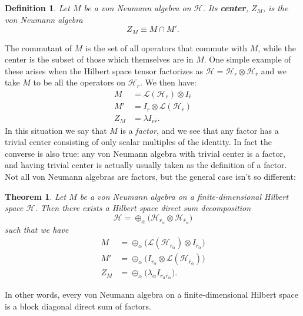 \documentclass[toc]{PoS}
\newcommand{\be}{\begin{equation}}
\newcommand{\ee}{\end{equation}}
\newcommand{\Ll}{\mathcal{L}}
\newcommand{\Hh}{\mathcal{H}}
\newcommand{\ol}{\overline}
\newtheorem{mydef}{Definition}[section]
\newtheorem{thm}{Theorem}[section]
\begin{document}
\begin{mydef}
Let $M$ be a von Neumann algebra on $\Hh$. Its \textbf{center}, $Z_M$, is the von Neumann algebra
\be
Z_M\equiv M\cap M'.
\ee
\end{mydef}
The commutant of $M$ is the set of all operators that commute with $M$, while the center is the subset of those which themselves are in $M$.  One simple example of these arises when the Hilbert space tensor factorizes as $\Hh=\Hh_r\otimes \Hh_{\ol{r}}$ and we take $M$ to be all the operators on $\Hh_r$.  We then have:
\begin{align}\nonumber
M&= \Ll(\Hh_r)\otimes I_{\ol{r}}\\\nonumber
M'&= I_r \otimes \Ll(\Hh_{\ol{r}})\\
Z_M&= \lambda I_{r\ol{r}}.
\end{align}
In this situation we say that $M$ is a \textit{factor}, and we see that any factor has a trivial center consisting of only scalar multiples of the identity.  In fact the converse is also true: any von Neumann algebra with trivial center is a factor, and having trivial center is actually usually taken as the definition of a factor.  Not all von Neumann algebras are factors, but the general case isn't so different:
\begin{thm}\label{vnthm}
Let $M$ be a von Neumann algebra on a finite-dimensional Hilbert space $\Hh$.  Then there exists a Hilbert space direct sum decomposition
\be\label{blockdecomp}
\Hh=\oplus_\alpha \Big(\Hh_{r_\alpha}\otimes \Hh_{\ol{r}_\alpha}\Big)
\ee
such that we have
\begin{align}\nonumber
M&=\oplus_\alpha\Big(\Ll(\Hh_{r_\alpha})\otimes I_{\ol{r}_\alpha}\Big)\\\nonumber
M'&= \oplus_\alpha\Big(I_{r_\alpha} \otimes \Ll(\Hh_{\ol{r}_\alpha})\Big)\\
Z_M&= \oplus_\alpha \Big(\lambda_\alpha I_{r_\alpha\ol{r}_\alpha}\Big).
\end{align}
\end{thm}
In other words, every von Neumann algebra on a finite-dimensional Hilbert space is a block diagonal direct sum of factors.  
\end{document}
